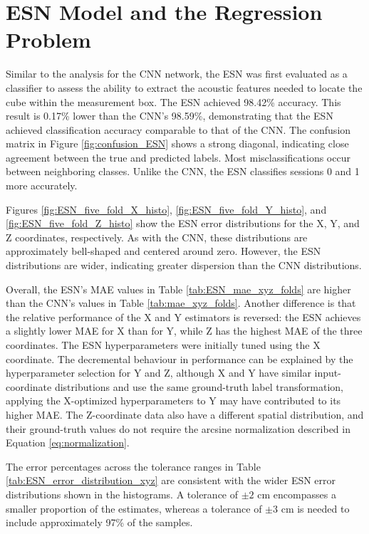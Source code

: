 \section{ESN Model and the Regression Problem}

Similar to the analysis for the CNN network, the ESN was first evaluated as a classifier to assess the ability to extract the acoustic features needed to locate the cube within the measurement box. The ESN achieved 98.42\% accuracy. This result is 0.17\% lower than the CNN's 98.59\%, demonstrating that the ESN achieved classification accuracy comparable to that of the CNN. The confusion matrix in Figure \ref{fig:confusion_ESN} shows a strong diagonal, indicating close agreement between the true and predicted labels. Most misclassifications occur between neighboring classes. Unlike the CNN, the ESN classifies sessions 0 and 1 more accurately.

Figures \ref{fig:ESN_five_fold_X_histo}, \ref{fig:ESN_five_fold_Y_histo}, and \ref{fig:ESN_five_fold_Z_histo} show the ESN error distributions for the X, Y, and Z coordinates, respectively. As with the CNN, these distributions are approximately bell-shaped and centered around zero. However, the ESN distributions are wider, indicating greater dispersion than the CNN distributions.

Overall, the ESN's MAE values in Table \ref{tab:ESN_mae_xyz_folds} are higher than the CNN's values in Table \ref{tab:mae_xyz_folds}. Another difference is that the relative performance of the X and Y estimators is reversed: the ESN achieves a slightly lower MAE for X than for Y, while Z has the highest MAE of the three coordinates. The ESN hyperparameters were initially tuned using the X coordinate. The decremental behaviour in performance can be explained by the hyperparameter selection for Y and Z, although X and Y have similar input-coordinate distributions and use the same ground-truth label transformation, applying the X-optimized hyperparameters to Y may have contributed to its higher MAE. The Z-coordinate data also have a different spatial distribution, and their ground-truth values do not require the arcsine normalization described in Equation \ref{eq:normalization}.

The error percentages across the tolerance ranges in Table \ref{tab:ESN_error_distribution_xyz} are consistent with the wider ESN error distributions shown in the histograms. A tolerance of $\pm 2$ cm encompasses a smaller proportion of the estimates, whereas a tolerance of $\pm 3$ cm is needed to include approximately 97\% of the samples.

